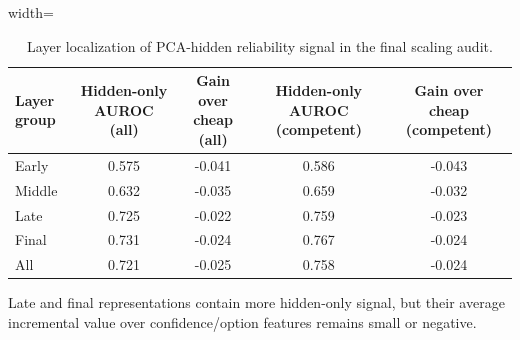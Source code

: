 \begin{table}[t]
\centering
\small
\caption{Layer localization of PCA-hidden reliability signal in the final scaling audit.}
\label{tab:layer-localization}
\begin{threeparttable}
\begin{adjustbox}{width=\textwidth}
\begin{tabular}{lcccc}
\toprule
Layer group & Hidden-only AUROC (all) & Gain over cheap (all) & Hidden-only AUROC (competent) & Gain over cheap (competent) \\
\midrule
Early & 0.575 & -0.041 & 0.586 & -0.043 \\
Middle & 0.632 & -0.035 & 0.659 & -0.032 \\
Late & 0.725 & -0.022 & 0.759 & -0.023 \\
Final & 0.731 & -0.024 & 0.767 & -0.024 \\
All & 0.721 & -0.025 & 0.758 & -0.024 \\
\bottomrule
\end{tabular}
\end{adjustbox}

\begin{tablenotes}[flushleft]\footnotesize\item \parbox{0.95\textwidth}{Late and final representations contain more hidden-only signal, but their average incremental value over confidence/option features remains small or negative.}\end{tablenotes}
\end{threeparttable}
\end{table}
